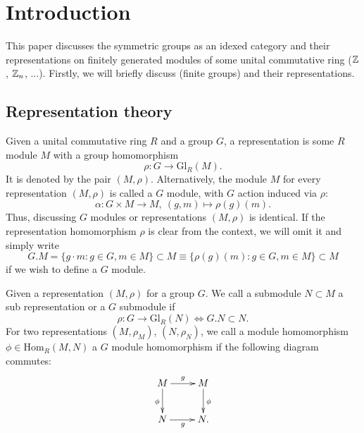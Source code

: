 \section{Introduction}
This paper discusses the symmetric groups as an idexed category and their representations on finitely generated modules of some unital commutative ring ($\mathbb{Z}$, $\mathbb{Z}_n$, ...). Firstly, we will briefly discuss (finite groups) and their representations.
\subsection{Representation theory}
Given a unital commutative ring $R$ and a group $G$, a representation is some $R$ module $M$ with a group homomorphism
$$\rho : G \longrightarrow \mathrm{Gl}_R(M).$$
It is denoted by the pair $(M, \rho)$. Alternatively, the module $M$ for every representation $(M, \rho)$ is called a $G$ module, with $G$ action induced via $\rho$:
$$\alpha : G \times M \longrightarrow M,\ (g, m) \longmapsto \rho(g)(m).$$
Thus, discussing $G$ modules or representations $(M, \rho)$ is identical. If the representation homomorphism $\rho$ is clear from the context, we will omit it and simply write
$$G.M = \{g \cdot m: g \in G, m \in M\} \subset M \equiv \{\rho(g)(m) : g \in G, m \in M\} \subset M$$
if we wish to define a $G$ module.
\begin{defi}
Given a representation $(M, \rho)$ for a group $G$. We call a submodule $N \subset M$ a sub representation or a $G$ submodule if
$$\rho : G \longrightarrow \mathrm{Gl}_R(N) \Leftrightarrow G.N \subset N.$$
For two representations $(M, \rho_M)$, $(N, \rho_N)$, we call a module homomorphism $\phi \in \mathrm{Hom}_R(M,N)$ a $G$ module homomorphism if the following diagram commutes:
$$\xymatrix{
M \ar[r]^{g}\ar[d]_\phi &M\ar[d]^\phi\\
N \ar[r]_g & N.\\
}$$
\end{defi}
